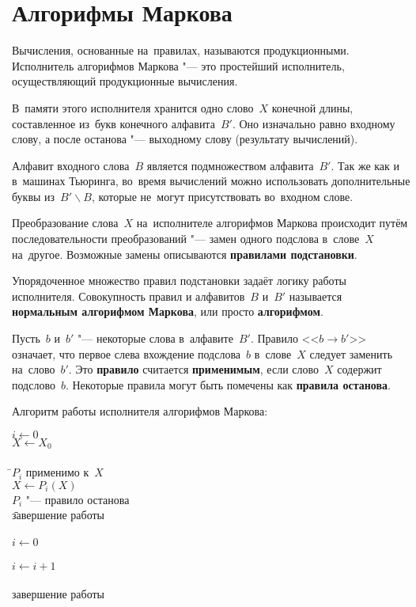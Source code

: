\section{Алгорифмы Маркова}
Вычисления, основанные на~правилах, называются продукционными. Исполнитель алгорифмов Маркова "--- это простейший исполнитель, осуществляющий продукционные вычисления.

В~памяти этого исполнителя хранится одно слово~\(X\) конечной длины, составленное из~букв конечного алфавита~\(B\prime\). Оно изначально равно входному слову, а после останова "--- выходному слову (результату вычислений).

Алфавит входного слова~\(B\) является подмножеством алфавита~\(B\prime\). Так же как и в~машинах Тьюринга, во~время вычислений можно использовать дополнительные буквы из~\(B\prime\backslash B\), которые не~могут присутствовать во~входном слове.

Преобразование слова~\(X\) на~исполнителе алгорифмов Маркова происходит путём последовательности преобразований "--- замен одного подслова в~слове~\(X\) на~другое. Возможные замены описываются \textbf{правилами подстановки}.

Упорядоченное множество правил подстановки задаёт логику работы исполнителя. Совокупность правил и алфавитов~\(B\) и~\(B\prime\) называется \textbf{нормальным алгорифмом Маркова}, или просто \textbf{алгорифмом}.

Пусть~\(b\) и~\(b\prime\) "--- некоторые слова в~алфавите~\(B\prime\). Правило <<\(b\rightarrow b\prime\)>> означает, что первое слева вхождение подслова~\(b\) в~слове~\(X\) следует заменить на~слово~\(b\prime\). Это \textbf{правило} считается \textbf{применимым}, если слово~\(X\) содержит подслово~\(b\). Некоторые правила могут быть помечены как \textbf{правила останова}.

Алгоритм работы исполнителя алгорифмов Маркова:
\begin{tabbing}
  \(i \leftarrow 0\) \\
  \(X \leftarrow X_0\) \\
   \\
  \quad
  \=\(P_i\) применимо к~\(X\) \\
  \>\quad
  \=\(X\leftarrow P_i\left(X\right)\) \\
  \>\>\(P_i\) "--- правило останова \\
  \>\>\quad
      \=завершение работы \\
  \>\> \\
  \>\>\(i\leftarrow 0\) \\
  \> \\
  \>\>\(i\leftarrow i + 1\) \\
  \>\> \\
  \>\>\>завершение работы \\
  \>\> \\
  \> \\
\end{tabbing}



